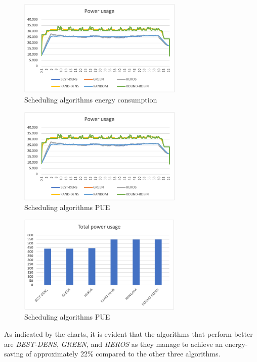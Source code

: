 \begin{figure}[h]
    \centering
    \includegraphics[width=0.7\textwidth]{chapters/images/schedulers_energyconsumption.png}
    \caption{Scheduling algorithms energy consumption}
    \label{fig:schedulers_energyconsumption}
\end{figure}

\begin{figure}[h]
    \centering
    \includegraphics[width=0.7\textwidth]{chapters/images/schedulers_energyconsumption.png}
    \caption{Scheduling algorithms PUE}
    \label{fig:schedulers_pue}
\end{figure}

\begin{figure}[h]
    \centering
    \includegraphics[width=0.7\textwidth]{chapters/images/schedulers_totalconsumption.png}
    \caption{Scheduling algorithms PUE}
    \label{fig:schedulers_totalconsumption}
\end{figure}
As indicated by the charts, it is evident that the algorithms that perform better are \emph{BEST-DENS}, \emph{GREEN}, and \emph{HEROS} as they manage to achieve an energy-saving of approximately 22\% compared to the other three algorithms.

